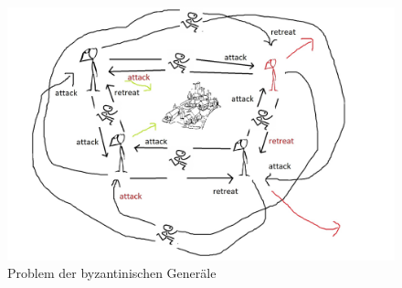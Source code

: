\documentclass[12pt]{article}
\begin{document}
\begin{figure}[htbp] 
  \centering
     \includegraphics[width=1\textwidth]{byzantineProblem.jpg}
  \caption{Problem der byzantinischen Generäle}
  \label{fig:Bild1}
\end{figure}
\end{document}
